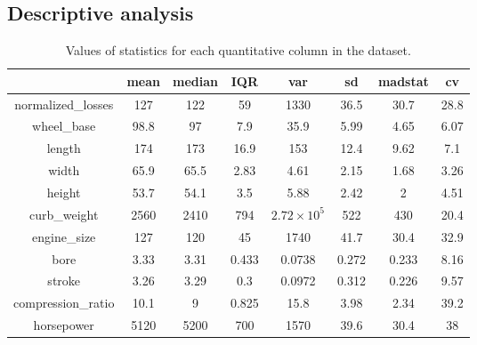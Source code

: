 \documentclass[11pt,a4paper]{article}\usepackage[]{graphicx}\usepackage[]{xcolor}
\begin{document}
	
	\subsection{Descriptive analysis}
	

			\begin{table}[ht]
			
			\centering
			
			\caption{Values of statistics  for each quantitative column in the dataset.} %
			\begin{tabular}{|c |c |c| c | c| c|c| c |} %
				
				\hline %
				 & mean & median & IQR & var & sd & madstat & cv\\ [0.5ex] %
    \hline
    
    
				
        	normalized\_losses & 127  & 122 & 59 & 1330& 36.5 & 30.7 & 28.8\\ \hline 
        	
				wheel\_base & 98.8  & 97 & 7.9
& 35.9& 5.99& 4.65 & 6.07\\ \hline

				length & 174&  173 & 16.9 &153&12.4& 9.62 & 7.1\\ \hline
				
				width & 65.9 & 65.5 & 2.83&4.61& 2.15& 1.68 & 3.26 \\ \hline
				
				height & 53.7 & 54.1 & 3.5 &5.88&2.42 &2 & 4.51\\ \hline
				
				curb\_weight & 2560 & 2410 & 794 &\ensuremath{2.72\times 10^{5}}&522 & 430 & 20.4\\ \hline
				
					engine\_size & 127 &  120&  45 &1740& 41.7& 30.4 & 32.9\\ \hline
					
						bore & 3.33 & 3.31& 0.433&0.0738& 0.272& 0.233 & 8.16\\ \hline
						
							stroke & 3.26 &3.29& 0.3&0.0972& 0.312& 0.226 & 9.57\\ \hline
							
								compression\_ratio & 10.1 & 9 &0.825&15.8& 3.98& 2.34 & 39.2\\ \hline
								
									horsepower &5120 & 5200 & 700&1570& 39.6& 30.4 & 38\\ \hline
									

\end{tabular}
\end{table}
\end{document}
